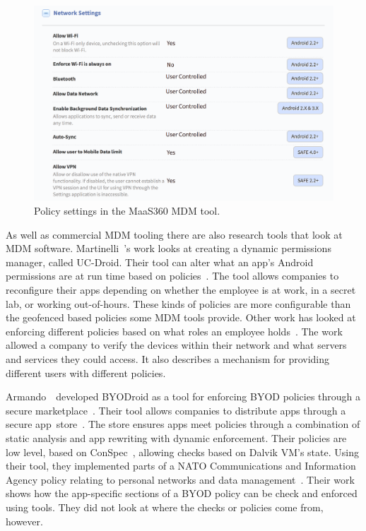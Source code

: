\documentclass[thesis.tex]{subfiles}
\begin{document}
\begin{figure}
  \centering
  \includegraphics[width=\textwidth]{figures/maas360-policy.png}
  \caption{Policy settings in the MaaS360 MDM tool.}
  \label{fig:maas360-policy}
\end{figure}

As well as commercial \ac{MDM} tooling there are also research tools that look
at MDM software. Martinelli~\etal{}'s work looks at creating a dynamic
permissions manager, called UC-Droid. Their tool can alter what an app's Android
permissions are at run time based on policies~\cite{martinelli_enhancing_2016}.
The tool allows companies to reconfigure their apps depending on whether the
employee is at work, in a secret lab, or working out-of-hours. These kinds of
policies are more configurable than the geofenced based policies some \ac{MDM}
tools provide. Other work has looked at enforcing different policies based on
what roles an employee holds~\cite{costantino_towards_2013}. The work allowed a
company to verify the devices within their network and what servers and services
they could access. It also describes a mechanism for providing different users
with different policies.

Armando~\etal~developed BYODroid as a tool for enforcing BYOD policies through a
secure marketplace~\cite{armando_bring_2013}. Their tool allows companies to
distribute apps through a secure app~store~\cite{armando_enabling_2014}. The
store ensures apps meet policies through a combination of static analysis and
app rewriting with dynamic enforcement. Their policies are low level, based on
ConSpec~\cite{aktug_conspec_2008}, allowing checks based on Dalvik VM's state.
Using their tool, they implemented parts of a NATO Communications and
Information Agency policy relating to personal networks and data
management~\cite{armando_developing_2016}. Their work shows how the app-specific
sections of a BYOD policy can be check and enforced using tools. They did not
look at where the checks or policies come from, however.
\end{document}
